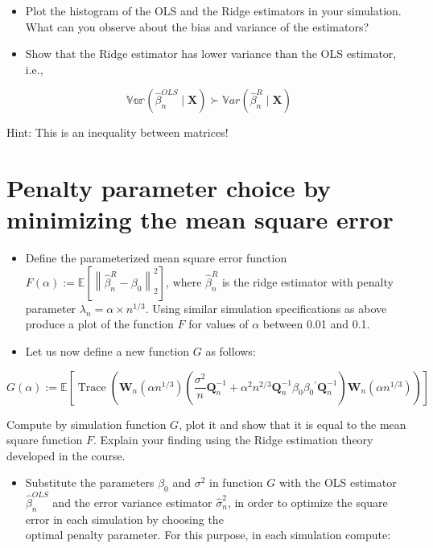 \begin{itemize}
  \item Plot the histogram of the OLS and the Ridge estimators in your simulation. What can you observe about the bias and variance of the estimators?
  \item Show that the Ridge estimator has lower variance than the OLS estimator, i.e.,
\end{itemize}

$$
\mathbb{V a r}\left(\hat{\beta}_{n}^{O L S} \mid \boldsymbol{X}\right) \succ \mathbb{V} a r\left(\hat{\beta}_{n}^{R} \mid \boldsymbol{X}\right)
$$

Hint: This is an inequality between matrices!

\section{Penalty parameter choice by minimizing the mean square error}
\begin{itemize}
  \item Define the parameterized mean square error function $F(\alpha):=\mathbb{E}\left[\left\|\hat{\beta}_{n}^{R}-\beta_{0}\right\|_{2}^{2}\right]$, where $\hat{\beta}_{n}^{R}$ is the ridge estimator with penalty parameter $\lambda_{n}=\alpha \times n^{1 / 3}$. Using similar simulation specifications as above produce a plot of the function $F$ for values of $\alpha$ between 0.01 and 0.1.
  \item Let us now define a new function $G$ as follows:
\end{itemize}

$$
G(\alpha):=\mathbb{E}\left[\operatorname{Trace}\left(\boldsymbol{W}_{n}\left(\alpha n^{1 / 3}\right)\left(\frac{\sigma^{2}}{n} \boldsymbol{Q}_{n}^{-1}+\alpha^{2} n^{2 / 3} \boldsymbol{Q}_{n}^{-1} \beta_{0} \beta_{0}{ }^{\prime} \boldsymbol{Q}_{n}^{-1}\right) \boldsymbol{W}_{n}\left(\alpha n^{1 / 3}\right)\right)\right]
$$

Compute by simulation function $G$, plot it and show that it is equal to the mean square function $F$. Explain your finding using the Ridge estimation theory developed in the course.

\begin{itemize}
  \item Substitute the parameters $\beta_{0}$ and $\sigma^{2}$ in function $G$ with the OLS estimator $\hat{\beta}_{n}^{O L S}$ and the error variance estimator $\hat{\sigma}_{n}^{2}$, in order to optimize the square error in each simulation by choosing the\\
optimal penalty parameter. For this purpose, in each simulation compute:
\end{itemize}

